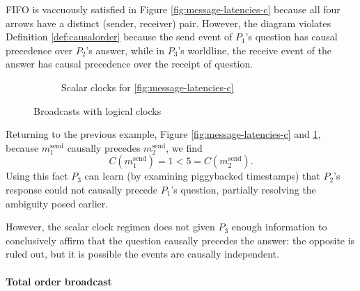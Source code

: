 \documentclass[]             %
{NASA}                       %
\theoremstyle{definition}
\begin{document}
FIFO is vaccuously satisfied in Figure \ref{fig:message-latencies-c}
because all four arrows have a distinct (sender, receiver)
pair. However, the diagram violates Definition \ref{def:causalorder}
because the send event of $P_1$'s question has causal precedence over
$P_2$'s answer, while in $P_3$'s worldline, the receive event of the
answer has causal precedence over the receipt of question.

\begin{figure}
  \begin{subfigure}{1\textwidth}
    \centering 
    \caption{Scalar clocks for \ref{fig:message-latencies-c}}
    \label{fig:message-latencies-scalar-c}
  \end{subfigure}

  \begin{subfigure}{1\textwidth}
    \centering 
    \label{fig:message-latencies-vector-c}
  \end{subfigure}

  \begin{subfigure}{1\textwidth}
    
    \label{fig:message-latencies-matrix-c}
  \end{subfigure}

  \caption{Broadcasts with logical clocks}
  \label{fig:broadcast-latencies}
\end{figure}

Returning to the previous example, Figure \ref{fig:message-latencies-c} and
\ref{fig:message-latencies-scalar-c}, because $m_1^\textrm{send}$
causally precedes $m_2^\textrm{send}$, we find
\[C(m_1^\textrm{send}) = 1 < 5 = C(m_2^\textrm{send}).\] Using this
fact $P_3$ can learn (by examining piggybacked timestamps) that
$P_2$'s response could not causally precede $P_1$'s question,
partially resolving the ambiguity posed earlier.

However, the scalar clock regimen does not given $P_3$ enough
information to conclusively affirm that the question causally precedes
the answer: the opposite is ruled out, but it is possible the events
are causally independent.

\paragraph{Total order broadcast}
\end{document}
